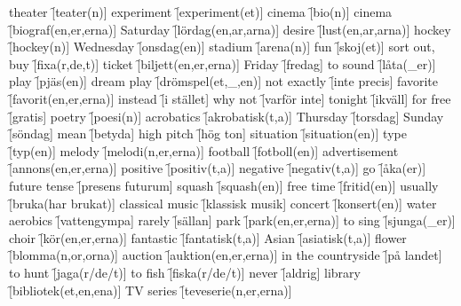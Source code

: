 \begin{questions}
    \begin{multicols}{2}
        \raggedcolumns
        \question theater \f[teater(n)]
        \question experiment \f[experiment(et)]
        \question cinema \f[bio(n)]
        \question cinema \f[biograf(en,er,erna)]
        \question Saturday \f[lördag(en,ar,arna)]
        \question desire \f[lust(en,ar,arna)]
        \question hockey \f[hockey(n)]
        \question Wednesday \f[onsdag(en)]
        \question stadium \f[arena(n)]
        \question fun \f[skoj(et)]
        \question sort out, buy \f[fixa(r,de,t)]
        \question ticket \f[biljett(en,er,erna)]
        \question Friday \f[fredag]
        \question to sound \f[låta(\_er)]
        \question play \f[pjäs(en)]
        \question dream play \f[drömspel(et,\_,en)]
        \question not exactly \f[inte precis]
        \question favorite \f[favorit(en,er,erna)]
        \question instead \f[i stället]
        \question why not \f[varför inte]
        \question tonight \f[ikväll]
        \question for free \f[gratis]
        \question poetry \f[poesi(n)]
        \question acrobatics \f[akrobatisk(t,a)]
        \question Thursday \f[torsdag]
        \question Sunday \f[söndag]
        \question mean \f[betyda]
        \question high pitch \f[hög ton]
        \question situation \f[situation(en)]
        \question type \f[typ(en)]
        \question melody \f[melodi(n,er,erna)]
        \question football \f[fotboll(en)]
        \question advertisement \f[annons(en,er,erna)]
        \question positive \f[positiv(t,a)]
        \question negative \f[negativ(t,a)]
        \question go \f[åka(er)]
        \question future tense \f[presens futurum]
        \question squash \f[squash(en)]
        \question free time \f[fritid(en)]
        \question usually \f[bruka(har brukat)]
        \question classical music \f[klassisk musik]
        \question concert \f[konsert(en)]
        \question water aerobics \f[vattengympa]
        \question rarely \f[sällan]
        \question park \f[park(en,er,erna)]
        \question to sing \f[sjunga(\_er)]
        \question choir \f[kör(en,er,erna)]
        \question fantastic \f[fantatisk(t,a)]
        \question Asian \f[asiatisk(t,a)]
        \question flower \f[blomma(n,or,orna)]
        \question auction \f[auktion(en,er,erna)]
        \question in the countryside \f[på landet]
        \question to hunt \f[jaga(r/de/t)]
        \question to fish \f[fiska(r/de/t)]
        \question never \f[aldrig]
        \question library \f[bibliotek(et,en,ena)]
        \question TV series \f[teveserie(n,er,erna)]

\end{multicols}
\end{questions}
